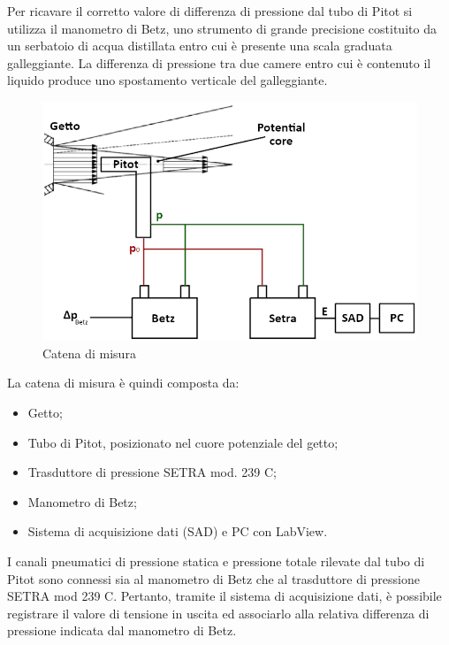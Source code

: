 \noindent Per ricavare il corretto valore di differenza di pressione dal tubo di Pitot si utilizza il manometro di Betz, uno strumento di grande precisione costituito da un serbatoio di acqua distillata entro cui è presente una scala graduata galleggiante. La differenza di pressione tra due camere entro cui è contenuto il liquido produce uno spostamento verticale del galleggiante.
\begin{figure}[h]
    \centering
    \includegraphics[width=.7\textwidth]{images/1/catena.png}
    \caption{Catena di misura}
\end{figure}

\noindent La catena di misura è quindi composta da:
\begin{itemize}
    \item Getto;
    \item Tubo di Pitot, posizionato nel cuore potenziale del getto;
    \item Trasduttore di pressione SETRA mod. 239 C; 
    \item Manometro di Betz;
    \item Sistema di acquisizione dati (SAD) e PC con LabView.
\end{itemize}

\noindent I canali pneumatici di pressione statica e pressione totale rilevate dal tubo di Pitot sono connessi sia al manometro di Betz che al trasduttore di pressione SETRA mod 239 C. Pertanto, tramite il sistema di acquisizione dati, è possibile registrare il valore di tensione in uscita ed associarlo alla relativa differenza di pressione indicata dal manometro di Betz.\\\\


